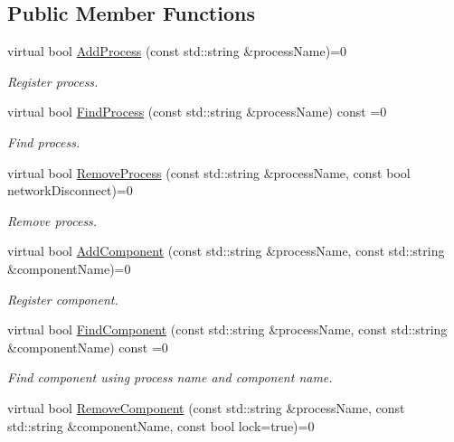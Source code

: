 \subsection*{Public Member Functions}
\begin{DoxyCompactItemize}
\item 
virtual bool \hyperlink{classmts_manager_global_interface_aab43e5975da509676e538ccea5a2612f}{Add\-Process} (const std\-::string \&process\-Name)=0
\begin{DoxyCompactList}\small\item\em Register process. \end{DoxyCompactList}\item 
virtual bool \hyperlink{classmts_manager_global_interface_ad13f404148109b90cd5ba6a886451e1a}{Find\-Process} (const std\-::string \&process\-Name) const =0
\begin{DoxyCompactList}\small\item\em Find process. \end{DoxyCompactList}\item 
virtual bool \hyperlink{classmts_manager_global_interface_a7ae020b18faaf5e27e3be93a43341969}{Remove\-Process} (const std\-::string \&process\-Name, const bool network\-Disconnect)=0
\begin{DoxyCompactList}\small\item\em Remove process. \end{DoxyCompactList}\item 
virtual bool \hyperlink{classmts_manager_global_interface_a2f31e91de48706864619b22bf3aeb227}{Add\-Component} (const std\-::string \&process\-Name, const std\-::string \&component\-Name)=0
\begin{DoxyCompactList}\small\item\em Register component. \end{DoxyCompactList}\item 
virtual bool \hyperlink{classmts_manager_global_interface_a9f839e7759c4cea8e013af38ffcb4708}{Find\-Component} (const std\-::string \&process\-Name, const std\-::string \&component\-Name) const =0
\begin{DoxyCompactList}\small\item\em Find component using process name and component name. \end{DoxyCompactList}\item 
virtual bool \hyperlink{classmts_manager_global_interface_a21dd4efb05af38dc6a47fd9d57382ecb}{Remove\-Component} (const std\-::string \&process\-Name, const std\-::string \&component\-Name, const bool lock=true)=0

\end{DoxyCompactItemize}
